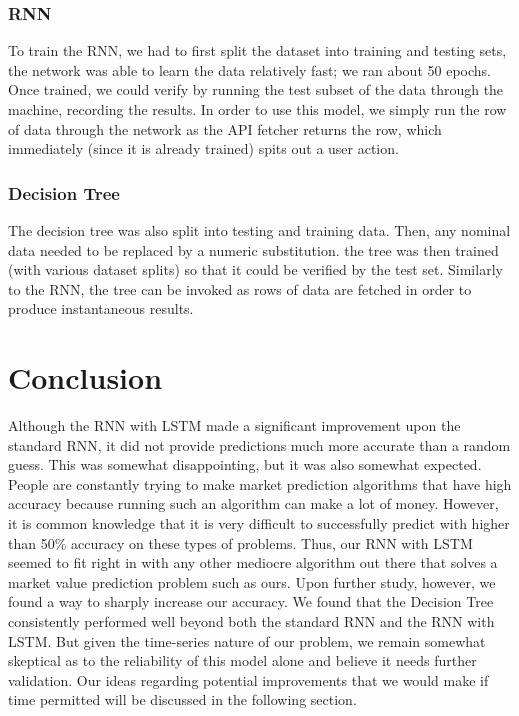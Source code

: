 \documentclass{article}
\begin{document}
\subsubsection{ RNN }
To train the RNN, we had to first split the dataset into training and testing sets, the network was able to learn the data relatively fast; we ran about 50 epochs. Once trained, we could verify by running the test subset of the data through the machine, recording the results. In order to use this model, we simply run the row of data through the network as the API fetcher returns the row, which immediately (since it is already trained) spits out a user action.
\subsubsection{ Decision Tree }
The decision tree was also split into testing and training data. Then, any nominal data needed to be replaced by a numeric substitution. the tree was then trained (with various dataset splits) so that it could be verified by the test set. Similarly to the RNN, the tree can be invoked as rows of data are fetched in order to produce instantaneous results.

\section{ Conclusion }
Although the RNN with LSTM made a significant improvement upon the standard RNN, it did not provide predictions much more accurate than a random guess. This was somewhat disappointing, but it was also somewhat expected. People are constantly trying to make market prediction algorithms that have high accuracy because running such an algorithm can make a lot of money. However, it is common knowledge that it is very difficult to successfully predict with higher than 50\% accuracy on these types of problems. Thus, our RNN with LSTM seemed to fit right in with any other mediocre algorithm out there that solves a market value prediction problem such as ours. 
Upon further study, however, we found a way to sharply increase our accuracy. We found that the Decision Tree consistently performed well beyond both the standard RNN and the RNN with LSTM. But given the time-series nature of our problem, we remain somewhat skeptical as to the reliability of this model alone and believe it needs further validation. Our ideas regarding potential improvements that we would make if time permitted will be discussed in the following section.
\end{document}

